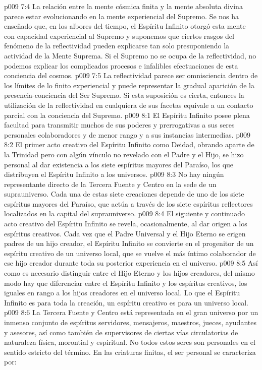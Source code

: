 \vs p009 7:4 \pc La relación entre la mente cósmica finita y la mente absoluta divina parece estar evolucionando en la mente experiencial del Supremo. Se nos ha enseñado que, en los albores del tiempo, el Espíritu Infinito otorgó esta mente con capacidad experiencial al Supremo y suponemos que ciertos rasgos del fenómeno de la reflectividad pueden explicarse tan solo presuponiendo la actividad de la Mente Suprema. Si el Supremo no se ocupa de la reflectividad, no podemos explicar los complicados procesos e infalibles efectuaciones de esta conciencia del cosmos.
\vs p009 7:5 La reflectividad parece ser omnisciencia dentro de los límites de lo finito experiencial y puede representar la gradual aparición de la presencia\hyp{}conciencia del Ser Supremo. Si esta suposición es cierta, entonces la utilización de la reflectividad en cualquiera de sus facetas equivale a un contacto parcial con la conciencia del Supremo.
\vs p009 8:1 El Espíritu Infinito posee plena facultad para transmitir muchos de sus poderes y prerrogativas a sus seres personales colaboradores y de menor rango y a sus instancias intermedias.
\vs p009 8:2 El primer acto creativo del Espíritu Infinito como Deidad, obrando aparte de la Trinidad pero con algún vínculo no revelado con el Padre y el Hijo, se hizo personal al dar existencia a los siete espíritus mayores del Paraíso, los que distribuyen el Espíritu Infinito a los universos.
\vs p009 8:3 No hay ningún representante directo de la Tercera Fuente y Centro en la sede de un suprauniverso. Cada una de estas siete creaciones depende de uno de los siete espíritus mayores del Paraíso, que actúa a través de los siete espíritus reflectores localizados en la capital del suprauniverso.
\vs p009 8:4 El siguiente y continuado acto creativo del Espíritu Infinito se revela, ocasionalmente, al dar origen a los espíritus creativos. Cada vez que el Padre Universal y el Hijo Eterno se erigen padres de un hijo creador, el Espíritu Infinito se convierte en el progenitor de un espíritu creativo de un universo local, que se vuelve el más íntimo colaborador de ese hijo creador durante toda su posterior experiencia en el universo.
\vs p009 8:5 Así como es necesario distinguir entre el Hijo Eterno y los hijos creadores, del mismo modo hay que diferenciar entre el Espíritu Infinito y los espíritus creativos, los iguales en rango a los hijos creadores en el universo local. Lo que el Espíritu Infinito es para toda la creación, un espíritu creativo es para un universo local.
\vs p009 8:6 \pc La Tercera Fuente y Centro está representada en el gran universo por un inmenso conjunto de espíritus servidores, mensajeros, maestros, jueces, ayudantes y asesores, así como también de supervisores de ciertas vías circulatorias de naturaleza física, morontial y espiritual. No todos estos seres son personales en el sentido estricto del término. En las criaturas finitas, el ser personal se caracteriza por:
